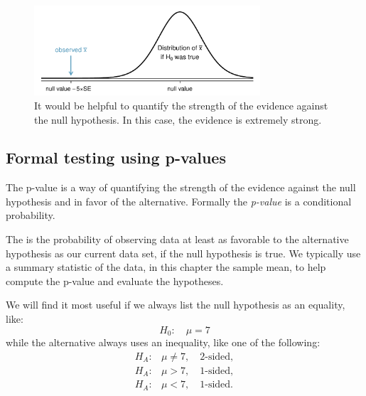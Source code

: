 \begin{figure}%
\centering
\includegraphics[width=0.75\textwidth]{ch_inference_foundations/figures/whyWeWantPValue/whyWeWantPValue}
\caption{It would be helpful to quantify the strength of the evidence against the null hypothesis. In this case, the evidence is extremely strong.}
\label{whyWeWantPValue}
\end{figure}


\subsection{Formal testing using p-values}
\label{pValue}


The p-value is a way of quantifying the strength of the evidence against the null hypothesis and in favor of the alternative. Formally the \emph{p-value} is a conditional probability.

\begin{termBox}{
The  is the probability of observing data at least as favorable to the alternative hypothesis as our current data set, if the null hypothesis is true. We typically use a summary statistic of the data, in this chapter the sample mean, to help compute the p-value and evaluate the hypotheses.}
\end{termBox}


\begin{tipBox}{
We will find it most useful if we always list the null hypothesis as an equality, like:
\[
H_0: \quad\mu = 7
\]
while the alternative always uses an inequality, like one of the following:
\begin{eqnarray*}
H_A:& \mu\neq7,\quad\text{2-sided},\\
H_A:& \mu>7,\quad\text{1-sided},\\
H_A:& \mu<7,\quad\text{1-sided}.
\end{eqnarray*}
}
\end{tipBox}

